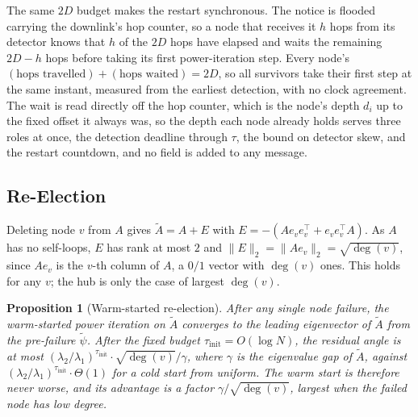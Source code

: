 \documentclass[letterpaper]{article} %
\newtheorem{proposition}{Proposition}
\begin{document}
The same $2D$ budget makes the restart synchronous. The notice is flooded
carrying the downlink's hop counter, so a node that receives it $h$ hops from its
detector knows that $h$ of the $2D$ hops have elapsed and waits the remaining
$2D-h$ hops before taking its first power-iteration step. Every node's
$(\text{hops travelled}) + (\text{hops waited}) = 2D$, so all survivors take
their first step at the same instant, measured from the earliest detection, with
no clock agreement. The wait is read directly off the hop counter, which is the
node's depth $d_i$ up to the fixed offset it always was, so the depth each node
already holds serves three roles at once, the detection deadline through $\tau$,
the bound on detector skew, and the restart countdown, and no field is added to
any message.

\subsection{Re-Election}

Deleting node $v$ from $A$ gives $\tilde A = A + E$ with
$E = -(A e_v e_v^\top + e_v e_v^\top A)$. As $A$ has no self-loops, $E$ has rank
at most $2$ and $\|E\|_2 = \|A e_v\|_2 = \sqrt{\deg(v)}$, since $A e_v$ is the
$v$-th column of $A$, a $0/1$ vector with $\deg(v)$ ones. This holds for any $v$;
the hub is only the case of largest $\deg(v)$.

\begin{proposition}[Warm-started re-election]
\label{prop:reelection}
After any single node failure, the warm-started power iteration on $\tilde A$ converges to the leading eigenvector of $\tilde A$ from the pre-failure $\tilde\psi$. After the fixed budget $\tau_{\mathrm{init}} = O(\log N)$, the residual angle is at most $(\lambda_2/\lambda_1)^{\tau_{\mathrm{init}}}\cdot\sqrt{\deg(v)}/\gamma$, where $\gamma$ is the eigenvalue gap of $\tilde A$, against $(\lambda_2/\lambda_1)^{\tau_{\mathrm{init}}}\cdot\Theta(1)$ for a cold start from uniform. The warm start is therefore never worse, and its advantage is a factor $\gamma/\sqrt{\deg(v)}$, largest when the failed node has low degree.
\end{proposition}
\end{document}
